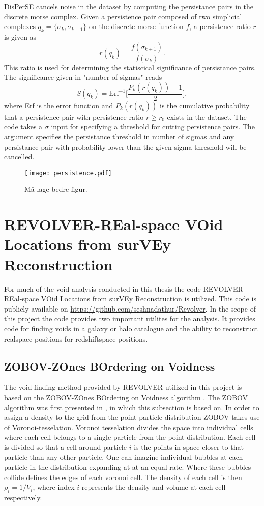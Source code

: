 DisPerSE cancels noise in the dataset by computing the persistance pairs
in the discrete morse complex. Given a persistence pair composed of two
simplicial complexes $q_k=\{\sigma_k,\sigma_{k+1}\}$ on the discrete morse
function $f$, a persistence ratio $r$ is given as
\begin{equation}
    r(q_k)=\frac{f(\sigma_{k+1})}{f(\sigma_k)}.
\end{equation}
This ratio is used for determining the statiscical significance of persistance
pairs. The significance given in "number of sigmas" reads 
\begin{equation}
    S(q_k)=\mathrm{Erf}^{-1}\Big[\frac{P_k(r(q_k))+1}{2}\Big],
\end{equation}
where Erf is the error function and $P_k(r(q_k))$ is the cumulative probability
that a persistence pair with persistence ratio $r\geq r_0$ exists in the
dataset. The code takes a $\sigma$ input for specifying a threshold for cutting
persistence pairs. The argument specifies the persistance threshold in number of
sigmas and any persistance pair with probability lower than the given sigma
threshold will be cancelled.


\begin{figure}\label{fig:persistence}
   \texttt{[image: persistence.pdf]}
   \caption{Må lage bedre figur.}
\end{figure}

\section{REVOLVER-REal-space VOid Locations from surVEy Reconstruction}
For much of the void analysis conducted in this thesis the code
REVOLVER-REal-space VOid Locations from surVEy Reconstruction is utilized. This
code is publicly available on \url{https://github.com/seshnadathur/Revolver}.
In the scope of this project the code provides two important utilites for the
analysis. It provides code for finding voids in a galaxy or halo catalogue and
the ability to reconstruct realspace positions for redshiftspace positions.
\subsection{ZOBOV-ZOnes BOrdering on Voidness}
The void finding method provided by REVOLVER utilized in this project is based
on the ZOBOV-ZOnes BOrdering on Voidness algorithm . The ZOBOV algorithm was
first presented in \cite{Neyrinck_2008}, in which this subsection is based on. In
order to assign a density to the grid from the point particle distribution ZOBOV
takes use of Voronoi-tesselation. Voronoi tesselation divides the space into
individual cells where each cell belongs to a single particle from the point
distribution. Each cell is divided so that a cell around particle $i$ is the
points in space closer to that particle than any other particle. One can imagine
individual bubbles at each particle in the distribution expanding at at an equal
rate. Where these bubbles collide defines the edges of each voronoi cell. The
density of each cell is then $\rho_i=1/V_i$, where index $i$ represents the
density and volume at each cell respectively.\\

